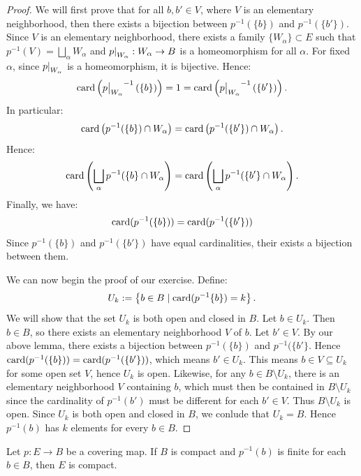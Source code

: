 \documentclass[10pt,oneside,openany]{memoir}
\begin{document}
	\begin{proof}
		We will first prove that for all $b,b' \in V$, where $V$ is an elementary neighborhood, then there exists a bijection between $p^{-1}(\{b\})$ and $p^{-1}(\{b'\})$. Since $V$ is an elementary neighborhood, there exists a family $\{W_\alpha\} \subset E$ such that $p^{-1}(V) = \bigsqcup_\alpha W_\alpha$ and $\restr{p}{W_\alpha}:W_\alpha \rightarrow B$ is a homeomorphism for all $\alpha$. For fixed $\alpha$, since $\restr{p}{W_\alpha}$ is a homeomorphism, it is bijective. Hence:
			\[
				\card\left(\restr{p}{W_\alpha}^{-1}\left(\{b\}\right)\right) = 1 = \card\left(\restr{p}{W_\alpha}^{-1}\left(\{b'\}\right)\right).
			\]
		In particular:
			\[
				\operatorname{card}\left( p^{-1}(\{b\} )\cap W_\alpha \right)  = \operatorname{card}\left( p^{-1}(\{b'\} )\cap W_\alpha \right).
			\] 
		Hence:
			\[
				\operatorname{card}\left( \bigsqcup_{\alpha} p^{-1}(\{b\} \cap W_\alpha\right) =\operatorname{card}\left( \bigsqcup_{\alpha} p^{-1}(\{b'\} \cap W_\alpha\right).
			\]
		Finally, we have:
			\[
				\operatorname{card}(p^{-1}(\{b\} )) = \operatorname{card}(p^{-1}(\{b'\}) ) 
			\]
		Since $p^{-1}(\{b\} )$ and $p^{-1}(\{b'\} )$ have equal cardinalities, their exists a bijection between them.

		We can now begin the proof of our exercise. Define:
			\[
			U_k := \left\{b \in B \mid \operatorname{card}(p^{-1}\{b\}) = k\right\}.
			\]
		We will show that the set $U_k$ is both open and closed in $B$. Let $b \in U_k$. Then $b \in B$, so there exists an elementary neighborhood $V$ of $b$. Let $b' \in V$. By our above lemma, there exists a bijection between $p^{-1}(\{b\} )$ and $p^{-1}(\{b'\} $. Hence $\operatorname{card}(p^{-1}(\{b\} )) = \operatorname{card}(p^{-1}(\{b'\} ))$, which means $b' \in U_k$. This means $b \in V \subseteq U_k$ for some open set $V$, hence $U_k$ is open. Likewise, for any $b \in B \setminus U_k$, there is an elementary neighborhood $V$ containing $b$, which must then be contained in $B \setminus U_k$ since the cardinality of $p^{-1}(b')$ must be different for each $b' \in V$. Thus $B \setminus U_k$ is open. Since $U_k$ is both open and closed in $B$, we conlude that $U_k = B$. Hence $p^{-1}(b)$ has $k$ elements for every $b \in B$.
	\end{proof}
\begin{exercise}[manual-num={6}]
	Let $p:E \rightarrow B$ be a covering map. If $B$ is compact and $p^{-1}(b)$ is finite for each $b \in B$, then $E$ is compact.
\end{exercise}
\end{document}
